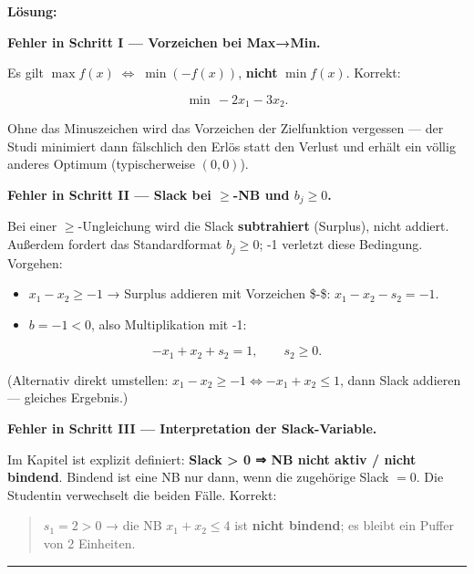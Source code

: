 \documentclass[11pt, a4paper]{article}
\begin{document}
\textbf{Lösung:}


\textbf{Fehler in Schritt I — Vorzeichen bei Max→Min.}

Es gilt $\max f(x) \;\Leftrightarrow\; \min(-f(x))$, \textbf{nicht} $\min f(x)$. Korrekt:

\[
\min\,-2x_1 - 3x_2.
\]

Ohne das Minuszeichen wird das Vorzeichen der Zielfunktion vergessen — der Studi minimiert dann fälschlich den Erlös statt den Verlust und erhält ein völlig anderes Optimum (typischerweise $(0,0)$).


\textbf{Fehler in Schritt II — Slack bei $\geq$-NB und $b_j \geq 0$.}

Bei einer $\geq$-Ungleichung wird die Slack \textbf{subtrahiert} (Surplus), nicht addiert. Außerdem fordert das Standardformat $b_j \geq 0$; -1 verletzt diese Bedingung. Vorgehen:

\begin{itemize}
  \item $x_1 - x_2 \geq -1$  →  Surplus addieren mit Vorzeichen \$-\$: $x_1 - x_2 - s_2 = -1$.
  \item $b = -1 < 0$, also Multiplikation mit -1:
\end{itemize}
\[
-x_1 + x_2 + s_2 = 1,\qquad s_2 \geq 0.
\]


(Alternativ direkt umstellen: $x_1 - x_2 \geq -1 \Leftrightarrow -x_1 + x_2 \leq 1$, dann Slack addieren — gleiches Ergebnis.)


\textbf{Fehler in Schritt III — Interpretation der Slack-Variable.}

Im Kapitel ist explizit definiert: \textbf{Slack > 0 ⇒ NB nicht aktiv / nicht bindend}. Bindend ist eine NB nur dann, wenn die zugehörige Slack $= 0$. Die Studentin verwechselt die beiden Fälle. Korrekt:

\begin{quote}
$s_1 = 2 > 0$ → die NB $x_1 + x_2 \leq 4$ ist \textbf{nicht bindend}; es bleibt ein Puffer von 2 Einheiten.
\end{quote}


\noindent\textcolor{rulegray}{\rule{\linewidth}{0.4pt}}





\end{document}
